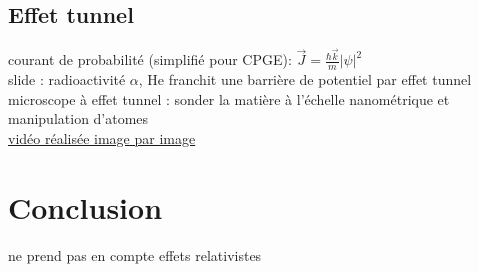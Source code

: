 \subsection{Effet tunnel}

courant de probabilité (simplifié pour CPGE): $\vec{J}=\frac{\hbar \vec{k}}{m} \lvert \psi \lvert ^2$ \\

slide : radioactivité $\alpha$, He franchit une barrière de potentiel par effet tunnel \\
microscope à effet tunnel : sonder la matière à l'échelle nanométrique et manipulation d'atomes \\
\href{https://youtu.be/oSCX78-8-q0}{vidéo réalisée image par image}



\section*{Conclusion}
ne prend pas en compte effets relativistes 

